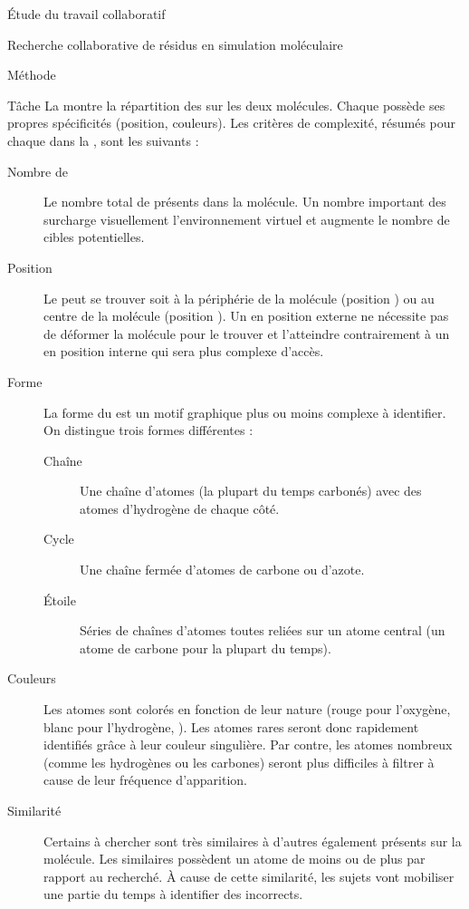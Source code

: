 \documentclass[myfrancais]{mythesis}
\begin{document}
\begin{mypart}{Étude du travail collaboratif}
\begin{mychapter}{Recherche collaborative de résidus en simulation moléculaire}
\begin{mysection}{Méthode}
\begin{mysubsection}{Tâche}
					La  montre la répartition des  sur les deux molécules.
					Chaque  possède ses propres spécificités (position, couleurs\myetc).
					Les critères de complexité, résumés pour chaque  dans la , sont les suivants :
					\begin{description}
						\item[Nombre de ] Le nombre total de  présents dans la molécule.
							Un nombre important des  surcharge visuellement l'environnement virtuel et augmente le nombre de cibles potentielles.
						\item[Position] Le  peut se trouver soit à la périphérie de la molécule (position ) ou au centre de la molécule (position ).
							Un  en position externe ne nécessite pas de déformer la molécule pour le trouver et l'atteindre contrairement à un  en position interne qui sera plus complexe d'accès.
						\item[Forme] La forme du  est un motif graphique plus ou moins complexe à identifier.
							On distingue trois formes différentes :
							\begin{description}
								\item[Chaîne] Une chaîne d'atomes (la plupart du temps carbonés) avec des atomes d'hydrogène de chaque côté.
								\item[Cycle] Une chaîne fermée d'atomes de carbone ou d'azote.
								\item[Étoile] Séries de chaînes d'atomes toutes reliées sur un atome central (un atome de carbone pour la plupart du temps).
							\end{description}
						\item[Couleurs] Les atomes sont colorés en fonction de leur nature (rouge pour l'oxygène, blanc pour l'hydrogène, \myetc).
							Les atomes rares seront donc rapidement identifiés grâce à leur couleur singulière.
							Par contre, les atomes nombreux (comme les hydrogènes ou les carbones) seront plus difficiles à filtrer à cause de leur fréquence d'apparition.
						\item[Similarité] Certains  à chercher sont très similaires à d'autres  également présents sur la molécule.
							Les  similaires possèdent un atome de moins ou de plus par rapport au  recherché.
							À cause de cette similarité, les sujets vont mobiliser une partie du temps à identifier des  incorrects.
					\end{description}


\end{mysubsection}
\end{mysection}
\end{mychapter}
\end{mypart}
\end{document}
